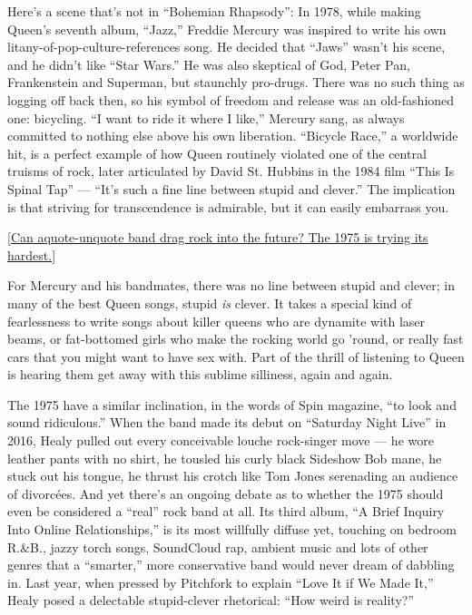 Here's a scene that's not in ``Bohemian Rhapsody'': In 1978, while
making Queen's seventh album, ``Jazz,'' Freddie Mercury was inspired to
write his own litany-of-pop-culture-references song. He decided that
``Jaws'' wasn't his scene, and he didn't like ``Star Wars.'' He was also
skeptical of God, Peter Pan, Frankenstein and Superman, but staunchly
pro-drugs. There was no such thing as logging off back then, so his
symbol of freedom and release was an old-fashioned one: bicycling. ``I
want to ride it where I like,'' Mercury sang, as always committed to
nothing else above his own liberation. ``Bicycle Race,'' a worldwide
hit, is a perfect example of how Queen routinely violated one of the
central truisms of rock, later articulated by David St. Hubbins in the
1984 film ``This Is Spinal Tap'' --- ``It's such a fine line between
stupid and clever.'' The implication is that striving for transcendence
is admirable, but it can easily embarrass you.

{[}\href{https://www.nytimes3xbfgragh.onion/2018/10/11/arts/music/the-1975-matty-healy-interview.html}{Can
a}\href{https://www.nytimes3xbfgragh.onion/2018/10/11/arts/music/the-1975-matty-healy-interview.html}{quote-unquote
band drag rock into the future? The 1975 is trying its hardest.}{]}

For Mercury and his bandmates, there was no line between stupid and
clever; in many of the best Queen songs, stupid \emph{is} clever. It
takes a special kind of fearlessness to write songs about killer queens
who are dynamite with laser beams, or fat-bottomed girls who make the
rocking world go 'round, or really fast cars that you might want to have
sex with. Part of the thrill of listening to Queen is hearing them get
away with this sublime silliness, again and again.

The 1975 have a similar inclination, in the words of Spin magazine, ``to
look and sound ridiculous.'' When the band made its debut on ``Saturday
Night Live'' in 2016, Healy pulled out every conceivable louche
rock-singer move --- he wore leather pants with no shirt, he tousled his
curly black Sideshow Bob mane, he stuck out his tongue, he thrust his
crotch like Tom Jones serenading an audience of divorcées. And yet
there's an ongoing debate as to whether the 1975 should even be
considered a ``real'' rock band at all. Its third album, ``A Brief
Inquiry Into Online Relationships,'' is its most willfully diffuse yet,
touching on bedroom R.\&B., jazzy torch songs, SoundCloud rap, ambient
music and lots of other genres that a ``smarter,'' more conservative
band would never dream of dabbling in. Last year, when pressed by
Pitchfork to explain ``Love It if We Made It,'' Healy posed a delectable
stupid-clever rhetorical: ``How weird is reality?''

